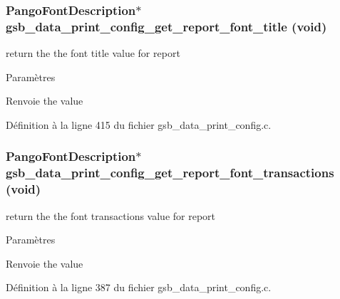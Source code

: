 \subsubsection[{gsb\_\-data\_\-print\_\-config\_\-get\_\-report\_\-font\_\-title}]{\setlength{\rightskip}{0pt plus 5cm}PangoFontDescription$\ast$ gsb\_\-data\_\-print\_\-config\_\-get\_\-report\_\-font\_\-title (void)}\label{gsb__data__print__config_8c_a42842df1055227a0faa8c7a17c2b2f46}
return the the font title value for report


\begin{DoxyParams}{Paramètres}
\item[{\em }]\end{DoxyParams}
\begin{DoxyReturn}{Renvoie}
the value 
\end{DoxyReturn}


Définition à la ligne 415 du fichier gsb\_\-data\_\-print\_\-config.c.

\subsubsection[{gsb\_\-data\_\-print\_\-config\_\-get\_\-report\_\-font\_\-transactions}]{\setlength{\rightskip}{0pt plus 5cm}PangoFontDescription$\ast$ gsb\_\-data\_\-print\_\-config\_\-get\_\-report\_\-font\_\-transactions (void)}\label{gsb__data__print__config_8c_a6adfdd58927d0c92a60106bcb1a94536}
return the the font transactions value for report


\begin{DoxyParams}{Paramètres}
\item[{\em }]\end{DoxyParams}
\begin{DoxyReturn}{Renvoie}
the value 
\end{DoxyReturn}


Définition à la ligne 387 du fichier gsb\_\-data\_\-print\_\-config.c.

